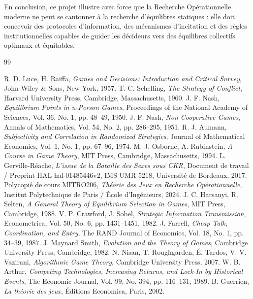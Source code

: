 \documentclass[11pt,a4paper]{article}
\begin{document}
En conclusion, ce projet illustre avec force que la Recherche Opérationnelle moderne ne peut se cantonner à la recherche d'équilibres statiques : elle doit concevoir des protocoles d'information, des mécanismes d'incitation et des règles institutionnelles capables de guider les décideurs vers des équilibres collectifs optimaux et équitables.

\newpage

\begin{thebibliography}{99}

 R. D. Luce, H. Raiffa, \emph{Games and Decisions: Introduction and Critical Survey}, John Wiley \& Sons, New York, 1957.
 T. C. Schelling, \emph{The Strategy of Conflict}, Harvard University Press, Cambridge, Massachusetts, 1960.
 J. F. Nash, \emph{Equilibrium Points in n-Person Games}, Proceedings of the National Academy of Sciences, Vol. 36, No. 1, pp. 48--49, 1950.
 J. F. Nash, \emph{Non-Cooperative Games}, Annals of Mathematics, Vol. 54, No. 2, pp. 286--295, 1951.
 R. J. Aumann, \emph{Subjectivity and Correlation in Randomized Strategies}, Journal of Mathematical Economics, Vol. 1, No. 1, pp. 67--96, 1974.
 M. J. Osborne, A. Rubinstein, \emph{A Course in Game Theory}, MIT Press, Cambridge, Massachusetts, 1994.
 L. Gerville-Réache, \emph{L'issue de la Bataille des Sexes sous CKR}, Document de travail / Preprint HAL hal-01485446v2, IMS UMR 5218, Université de Bordeaux, 2017.
 Polycopié de cours MITRO206, \emph{Théorie des Jeux en Recherche Opérationnelle}, Institut Polytechnique de Paris / École d'Ingénieurs, 2024.
 J. C. Harsanyi, R. Selten, \emph{A General Theory of Equilibrium Selection in Games}, MIT Press, Cambridge, 1988.
 V. P. Crawford, J. Sobel, \emph{Strategic Information Transmission}, Econometrica, Vol. 50, No. 6, pp. 1431--1451, 1982.
 J. Farrell, \emph{Cheap Talk, Coordination, and Entry}, The RAND Journal of Economics, Vol. 18, No. 1, pp. 34--39, 1987.
 J. Maynard Smith, \emph{Evolution and the Theory of Games}, Cambridge University Press, Cambridge, 1982.
 N. Nisan, T. Roughgarden, É. Tardos, V. V. Vazirani, \emph{Algorithmic Game Theory}, Cambridge University Press, 2007.
 W. B. Arthur, \emph{Competing Technologies, Increasing Returns, and Lock-In by Historical Events}, The Economic Journal, Vol. 99, No. 394, pp. 116--131, 1989.
 B. Guerrien, \emph{La théorie des jeux}, Éditions Economica, Paris, 2002.
\end{thebibliography}
\end{document}
